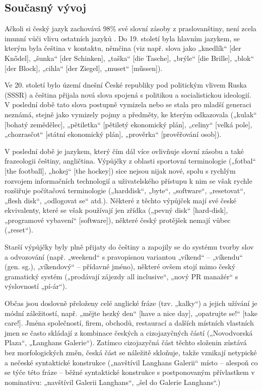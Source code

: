 \begin{multicols}{2}
\subsection{Současný vývoj}

Ačkoli si český jazyk zachovává 98\% své slovní zásoby z praslovanštiny, není zcela imunní vůči vlivu ostatních jazyků \cite{Note5}. Do 19. století byla hlavním jazykem, se kterým byla čeština v kontaktu, němčina (viz např. slova jako „knedlík“ {[}der Knődel{]}, „šunka“ {[}der Schinken{]}, „taška“ {[}die Tasche{]}, „brýle“ {[}die Brille{]}, „blok“ {[}der Block{]}, „cihla“ {[}der Ziegel{]}, „muset“ {[}műssen{]}).

Ve 20. století bylo území dnešní České republiky pod politickým vlivem Ruska (SSSR) a čeština přijala nová slova spojená s politikou a socialistickou ideologií. V poslední době tato slova postupně vymizela nebo se stala pro mladší generaci neznámá, stejně jako vymizely pojmy a předměty, ke kterým odkazovala („kulak“ {[}bohatý zemědělec{]}, „pětiletka“ {[}pětiletý ekonomický plán{]}, „celiny“ {[}velká pole{]}, „chozrasčot“ {[}státní ekonomický plán{]}, „prověrka“ {[}prověřování osob{]}).

V poslední době je jazykem, který čím dál více ovlivňuje slovní zásobu a také frazeologii češtiny, angličtina. Výpůjčky z oblasti sportovní terminologie („fotbal“ {[}the football{]}, „hokej“ {[}the hockey{]}) sice nejsou nijak nové, spolu s rychlým rozvojem informačních technologií a uživatelského přístupu k nim se však rychle rozšiřuje počítačová terminologie („harddisk“, „byte“, „software“, „resetovat“, „flesh disk“, „odlogovat se“ atd.). Některé z těchto výpůjček mají své české ekvivalenty, které se však používají jen zřídka („pevný disk“ {[}hard-disk{]}, „programové vybavení“ {[}software{]}), některé český protějšek nemají vůbec („reset“).\vspace*{-0.009cm}

Starší výpůjčky byly plně přijaty do češtiny a zapojily se do systému tvorby slov a odvozování (např. „weekend“ s pravopisnou variantou „víkend“ – „víkendu“ (gen. sg.), „víkendový“ – přídavné jméno), některé ovšem stojí mimo český gramatický systém („prodávají zájezdy all inclusive“, „nový PR manažér“ s výslovností „pí-ár“).\vspace*{-0.009cm}

Občas jsou doslovně přeloženy celé anglické fráze (tzv. „kalky“) a jejich užívání je módní záležitostí, např. „mějte hezký den“ {[}have a nice day{]}, „opatrujte se!“ {[}take care!{]}. Jména společností, firem, obchodů, restaurací a dalších místních vlastních jmen se často skládají z kombinace českých a cizojazyčných částí („Novodvorská Plaza“, „Langhans Galerie“). Zatímco cizojazyčná část těchto složenin zůstává bez morfologických změn, česká část se náležitě skloňuje, takže vznikají netypické a nečeské syntaktické konstrukce („navštívil Langhans Galerii“ místo – alespoň co se týče této fráze – běžné syntaktické konstrukce s postponovaným přívlastkem v nominativu: „navštívil Galerii Langhans“, „šel do Galerie Langhans“.)\vspace*{-0.009cm}


\end{multicols}
